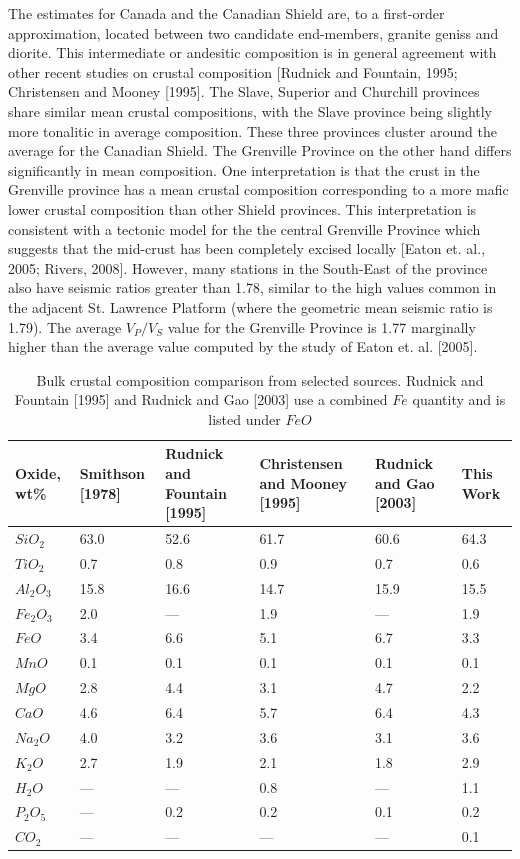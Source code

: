 \documentclass[draft, 12pt]{article}
\begin{document}
The estimates for Canada and the Canadian Shield are, to a first-order approximation, located between two candidate end-members, granite geniss and diorite. This intermediate or andesitic composition is in general agreement with other recent studies on crustal composition [Rudnick and Fountain, 1995; Christensen and Mooney [1995]. The Slave, Superior and Churchill provinces share similar mean crustal compositions, with the Slave province being slightly more tonalitic in average composition. These three provinces cluster around the average for the Canadian Shield. The Grenville Province on the other hand differs significantly in mean composition. One interpretation is that the crust in the Grenville province has a mean crustal composition corresponding to a more mafic lower crustal composition than other Shield provinces. This interpretation is consistent with a tectonic model for the the central Grenville Province which suggests that the mid-crust has been completely excised locally [Eaton et. al., 2005; Rivers, 2008]. However, many stations in the South-East of the province also have seismic ratios greater than 1.78, similar to the high values common in the adjacent St. Lawrence Platform (where the geometric mean seismic ratio is 1.79). The average $V_P/V_S$ value for the Grenville Province is 1.77 marginally higher than the average value computed by the study of Eaton et. al. [2005].

\begin{table}
  \begin{tabular}{ p{2cm} p{2cm} p{2cm} p{2cm} p{2cm} p{2cm} }
    \hline
    Oxide, wt\% & Smithson [1978] & Rudnick and Fountain [1995] & Christensen and Mooney [1995] & Rudnick and Gao [2003] & This Work \\
    \hline
    $SiO_2$   & 63.0 & 52.6 & 61.7 & 60.6 & 64.3 \\
    $TiO_2$   & 0.7 & 0.8 & 0.9 & 0.7 & 0.6 \\
    $Al_2O_3$ & 15.8 & 16.6 & 14.7 & 15.9 & 15.5 \\
    $Fe_2O_3$ & 2.0 & --- & 1.9 & --- & 1.9 \\
    $FeO$     & 3.4 & 6.6 & 5.1 & 6.7 & 3.3 \\
    $MnO$     & 0.1 & 0.1 & 0.1 & 0.1 & 0.1 \\
    $MgO$     & 2.8 & 4.4 & 3.1 & 4.7 & 2.2 \\
    $CaO$     & 4.6 & 6.4 & 5.7 & 6.4 & 4.3 \\
    $Na_2O$   & 4.0 & 3.2 & 3.6 & 3.1 & 3.6 \\
    $K_2O$    & 2.7 & 1.9 & 2.1 & 1.8 & 2.9 \\
    $H_2O$    & --- & --- & 0.8 & --- & 1.1 \\
    $P_2O_5$  & --- & 0.2 & 0.2 & 0.1 & 0.2 \\
    $CO_2$    & --- & --- & --- & --- & 0.1 \\
    \hline
  \end{tabular}
  \caption{Bulk crustal composition comparison from selected sources. Rudnick and Fountain [1995] and Rudnick and Gao [2003] use a combined $Fe$ quantity and is listed under $FeO$}
\label{table:composition}

\end{table}
\end{document}
